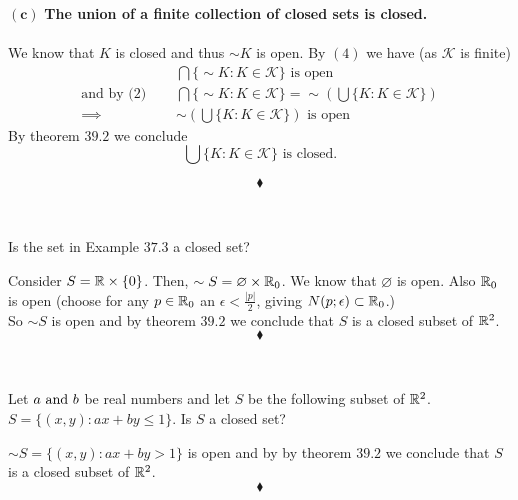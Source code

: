 $\mathbf{(c)}$ \textbf{The union of a finite collection of closed sets is closed.}\\\\
We know that $K$ is closed and thus $\sim K$ is open. By $(4)$ we have (as $\mathscr{K}$ is finite)
\begin{align*}
& \bigcap\{\sim K:K\in\mathscr{K}\} \text{ is open}\\
\text{and by (2) }\quad  & \bigcap\{\sim K:K\in\mathscr{K}\} = \sim \left(\bigcup\{ K:K\in\mathscr{K}\}\right)\\
\implies\quad &   \sim\left(\bigcup\{ K:K\in\mathscr{K}\}\right) \text{ is open}
\end{align*}
By theorem $\mathbf{39.2}$ we conclude 
$$\bigcup\{ K:K\in\mathscr{K}\} \text{ is closed.}$$


$$\blacklozenge$$\\


\subsection{}
\begin{tcolorbox}
Is the set in Example $\mathbf{37.3 }$ a closed set?
\end{tcolorbox}
Consider $S=\mathbb{R}\times\{0\}$. Then, $\sim S=\varnothing\times \mathbb{R}_{0}$. We know that $\varnothing$ is open. Also $\mathbb{R}_{0}$ is open (choose for any $p\in \mathbb{R}_{0}$ an $\epsilon<\frac{|p|}{2}$, giving $N(p;\epsilon)\subset \mathbb{R}_{0}$.)\\
So $\sim S$ is open and by theorem $\mathbf{39.2}$ we conclude that $S$ is a closed subset of $\mathbb{R}^2$.
$$\blacklozenge$$\\


\subsection{}
\begin{tcolorbox}
Let $a \text{ and } b$ be real numbers and let $S$ be the following subset of $\mathbb{R}^2$. $ S = \{(x,y):ax + by \leq 1\}$. Is $S$ a closed set?
\end{tcolorbox}
$ \sim S = \{(x,y):ax + by > 1\}$ is open and by by theorem $\mathbf{39.2}$ we conclude that $S$ is a closed subset of $\mathbb{R}^2$.
$$\blacklozenge$$\\

